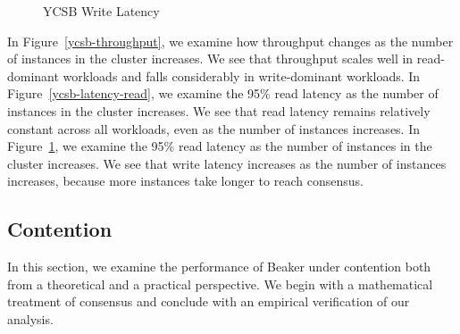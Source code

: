 \documentclass[../main.tex]{subfiles}
\begin{document}
  \begin{figure}[h]
    \caption{YCSB Write Latency}
    \label{ycsb-latency-write}
    \centering
  \end{figure}

  In Figure~\ref{ycsb-throughput}, we examine how throughput changes as the number of instances in
  the cluster increases. We see that throughput scales well in read-dominant workloads and falls
  considerably in write-dominant workloads. In Figure~\ref{ycsb-latency-read}, we examine the 95\%
  read latency as the number of instances in the cluster increases. We see that read latency remains
  relatively constant across all workloads, even as the number of instances increases. In
  Figure~\ref{ycsb-latency-write}, we examine the 95\% read latency as the number of instances in
  the cluster increases. We see that write latency increases as the number of instances increases,
  because more instances take longer to reach consensus.

  \subsection{Contention}
  In this section, we examine the performance of Beaker under contention both from a theoretical
  and a practical perspective. We begin with a mathematical treatment of consensus and conclude with
  an empirical verification of our analysis.
\end{document}
